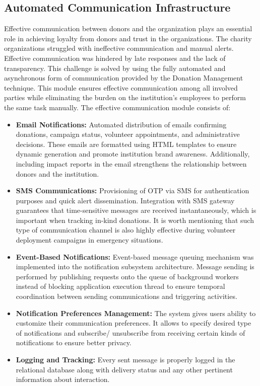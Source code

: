 \documentclass{thesis-library}
\begin{document}
\subsection{Automated Communication Infrastructure}

Effective communication between donors and the organization plays an essential role in achieving loyalty from donors and trust in the organizations. The charity organizations struggled with ineffective communication and manual alerts. Effective communication was hindered by late responses and the lack of transparency. This challenge is solved by using the fully automated and asynchronous form of communication provided by the Donation Management technique. This module ensures effective communication among all involved parties while eliminating the burden on the institution’s employees to perform the same task manually. The effective communication module consists of:

\begin{itemize}
    \item \textbf{Email Notifications:} Automated distribution of emails confirming donations, campaign status, volunteer appointments, and administrative decisions. These emails are formatted using HTML templates to ensure dynamic generation and promote institution brand awareness. Additionally, including impact reports in the email strengthens the relationship between donors and the institution.
    \item \textbf{SMS Communications:} Provisioning of OTP via SMS for authentication purposes and quick alert dissemination. Integration with SMS gateway guarantees that time-sensitive messages are received instantaneously, which is important when tracking in-kind donations. It is worth mentioning that such type of communication channel is also highly effective during volunteer deployment campaigns in emergency situations.
    \item \textbf{Event-Based Notifications:} Event-based message queuing mechanism was implemented into the notification subsystem architecture. Message sending is performed by publishing requests onto the queue of background workers instead of blocking application execution thread to ensure temporal coordination between sending communications and triggering activities.
    \item \textbf{Notification Preferences Management:} The system gives users ability to customize their communication preferences. It allows to specify desired type of notifications and subscribe/ unsubscribe from receiving certain kinds of notifications to ensure better privacy.
    \item \textbf{Logging and Tracking:} Every sent message is properly logged in the relational database along with delivery status and any other pertinent information about interaction.
\end{itemize}
\end{document}
